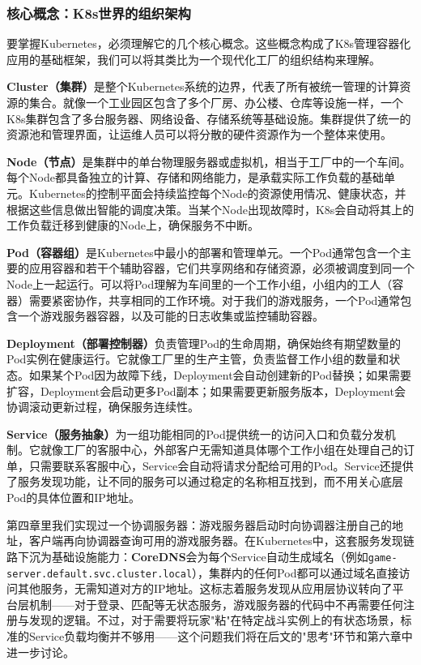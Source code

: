 \subsubsection{核心概念：K8s世界的组织架构}

要掌握Kubernetes，必须理解它的几个核心概念。这些概念构成了K8s管理容器化应用的基础框架，我们可以将其类比为一个现代化工厂的组织结构来理解。

\textbf{Cluster（集群）}是整个Kubernetes系统的边界，代表了所有被统一管理的计算资源的集合。就像一个工业园区包含了多个厂房、办公楼、仓库等设施一样，一个K8s集群包含了多台服务器、网络设备、存储系统等基础设施。集群提供了统一的资源池和管理界面，让运维人员可以将分散的硬件资源作为一个整体来使用。

\textbf{Node（节点）}是集群中的单台物理服务器或虚拟机，相当于工厂中的一个车间。每个Node都具备独立的计算、存储和网络能力，是承载实际工作负载的基础单元。Kubernetes的控制平面会持续监控每个Node的资源使用情况、健康状态，并根据这些信息做出智能的调度决策。当某个Node出现故障时，K8s会自动将其上的工作负载迁移到健康的Node上，确保服务不中断。

\textbf{Pod（容器组）}是Kubernetes中最小的部署和管理单元。一个Pod通常包含一个主要的应用容器和若干个辅助容器，它们共享网络和存储资源，必须被调度到同一个Node上一起运行。可以将Pod理解为车间里的一个工作小组，小组内的工人（容器）需要紧密协作，共享相同的工作环境。对于我们的游戏服务，一个Pod通常包含一个游戏服务器容器，以及可能的日志收集或监控辅助容器。

\textbf{Deployment（部署控制器）}负责管理Pod的生命周期，确保始终有期望数量的Pod实例在健康运行。它就像工厂里的生产主管，负责监督工作小组的数量和状态。如果某个Pod因为故障下线，Deployment会自动创建新的Pod替换；如果需要扩容，Deployment会启动更多Pod副本；如果需要更新服务版本，Deployment会协调滚动更新过程，确保服务连续性。

\textbf{Service（服务抽象）}为一组功能相同的Pod提供统一的访问入口和负载分发机制。它就像工厂的客服中心，外部客户无需知道具体哪个工作小组在处理自己的订单，只需要联系客服中心，Service会自动将请求分配给可用的Pod。Service还提供了服务发现功能，让不同的服务可以通过稳定的名称相互找到，而不用关心底层Pod的具体位置和IP地址。

第四章里我们实现过一个协调服务器：游戏服务器启动时向协调器注册自己的地址，客户端再向协调器查询可用的游戏服务器。在Kubernetes中，这套服务发现链路下沉为基础设施能力：\textbf{CoreDNS}会为每个Service自动生成域名（例如\texttt{game-server.default.svc.cluster.local}），集群内的任何Pod都可以通过域名直接访问其他服务，无需知道对方的IP地址。这标志着服务发现从应用层协议转向了平台层机制——对于登录、匹配等无状态服务，游戏服务器的代码中不再需要任何注册与发现的逻辑。不过，对于需要将玩家"粘"在特定战斗实例上的有状态场景，标准的Service负载均衡并不够用——这个问题我们将在后文的"思考"环节和第六章中进一步讨论。

